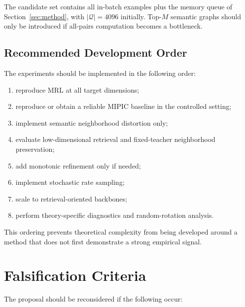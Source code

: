 \documentclass[11pt]{article}
\begin{document}
The candidate set contains all in-batch examples plus the memory queue of Section~\ref{sec:method}, with $|\mathcal Q|=4096$ initially.
Top-$M$ semantic graphs should only be introduced if all-pairs computation becomes a bottleneck.


\subsection{Recommended Development Order}

The experiments should be implemented in the following order:

\begin{enumerate}[leftmargin=1.5em]

    \item reproduce MRL at all target dimensions;

    \item reproduce or obtain a reliable MIPIC baseline in the controlled setting;

    \item implement semantic neighborhood distortion only;

    \item evaluate low-dimensional retrieval and fixed-teacher neighborhood preservation;

    \item add monotonic refinement only if needed;

    \item implement stochastic rate sampling;

    \item scale to retrieval-oriented backbones;

    \item perform theory-specific diagnostics and random-rotation analysis.

\end{enumerate}

This ordering prevents theoretical complexity from being developed around a method that does not first demonstrate a strong empirical signal.


\section{Falsification Criteria}

The proposal should be reconsidered if the following occur:
\end{document}
